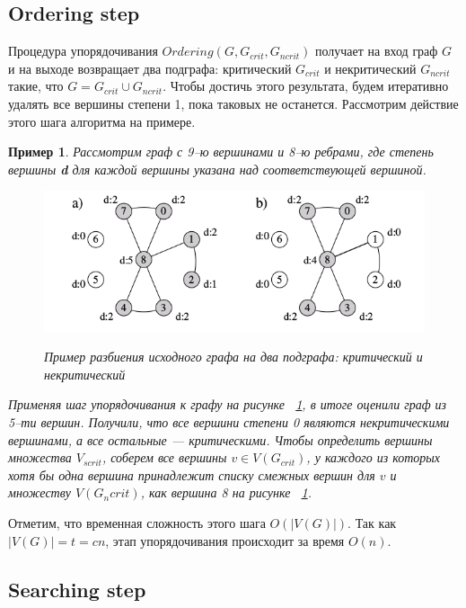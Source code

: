 \documentclass[specialist,
               substylefile = spbu.rtx,
               subf,href,colorlinks=true, 12pt]{disser}
\newtheorem{myexample}{Пример}
\begin{document}
\subsection{Ordering step}

Процедура упорядочивания $Ordering (G, G_{crit}, G_{ncrit})$ получает на вход граф $G$ и на выходе возвращает два подграфа: критический $G_{crit}$ и некритический $G_{ncrit}$ такие, что $G = G_{crit} \cup G_{ncrit}$. Чтобы достичь этого результата, будем итеративно удалять все вершины степени 1, пока таковых не останется. Рассмотрим действие этого шага алгоритма на примере.

\begin{myexample}
Рассмотрим граф с 9--ю вершинами и 8--ю ребрами, где степень вершины \textbf{d} для каждой вершины указана над соответствующей вершиной.

\begin{figure}[h]
\begin{center}
\includegraphics[scale=0.5]{imgs/ex2.jpg}\label{im:ex2}
\caption{Пример разбиения исходного графа на два подграфа: критический и некритический}
\end{center}
\end{figure}

Применяя шаг упорядочивания к графу на рисунке ~\ref{im:ex2}, в итоге оценили граф из 5--ти вершин. Получили, что все вершини степени 0 являются некритическими вершинами, а все остальные --- критическими. Чтобы определить вершины множества $V_{scrit}$, соберем все вершины $v \in V(G_{crit})$, у каждого из которых хотя бы одна вершина принадлежит списку смежных вершин для $v$ и множеству $V(G_ncrit)$, как вершина 8 на рисунке ~\ref{im:ex2}.
\end{myexample}

Отметим, что временная сложность этого шага $\mathit{O}(|V(G)|)$. Так как $|V(G)| = t = cn$, этап упорядочивания происходит за время $\mathit{O}(n)$.

\newpage

\subsection{Searching step}
\end{document}
